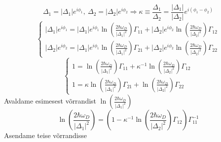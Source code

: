\documentclass[class=article, crop=false]{standalone}
\begin{document}
\begin{equation}\label{key}
	\Delta_{1} = \left| \Delta_{1} \right| e^{i \phi_{1}},\ \Delta_{2} = \left| \Delta_{2} \right| e^{i \phi_{2}} \Rightarrow \kappa \equiv \frac{ \Delta_{1}}{ \Delta_{2}} = \frac{ \left| \Delta_{1} \right|}{\left| \Delta_{2} \right|} e^{i ( \phi_{1} - \phi_{2})}
\end{equation}
\begin{equation}\label{PiluVorrandiSusteemNullTemp}
	\begin{cases}
		\left| \Delta_{1} \right| e^{i \phi_{1}} = \left| \Delta_{1} \right| e^{i \phi_{1}} \ln \left( \frac{2 \hbar \omega_{D}}{ \left| \Delta_{ 1} \right|^{2}} \right) \Gamma_{11} + 
		\left| \Delta_{2} \right| e^{i \phi_{2}} \ln \left( \frac{2 \hbar \omega_{D}}{ \left| \Delta_{ 2} \right|^{2}} \right) \Gamma_{12} \\
		\left| \Delta_{2} \right| e^{i \phi_{2}} = \left| \Delta_{1} \right| e^{i \phi_{1}} \ln \left( \frac{2 \hbar \omega_{D}}{ \left| \Delta_{ 1} \right|^{2}} \right) \Gamma_{21} + \left| \Delta_{2} \right| e^{i \phi_{2}} \ln \left( \frac{2 \hbar \omega_{D}}{ \left| \Delta_{ 2} \right|^{2}} \right) \Gamma_{22}
	\end{cases}
\end{equation}
\begin{equation}\label{key}
	\begin{cases}
		1 = \ln \left( \frac{2 \hbar \omega_{D}}{ \left| \Delta_{ 1} \right|^{2}} \right) \Gamma_{11} + 
		\kappa^{-1} \ln \left( \frac{2 \hbar \omega_{D}}{ \left| \Delta_{ 2} \right|^{2}} \right) \Gamma_{12} \\
		1 = \kappa \ln \left( \frac{2 \hbar \omega_{D}}{ \left| \Delta_{ 1} \right|^{2}} \right) \Gamma_{21} + \ln \left( \frac{2 \hbar \omega_{D}}{ \left| \Delta_{ 2} \right|^{2}} \right) \Gamma_{22}
	\end{cases}
\end{equation}
Avaldame esimesest võrrandist $ \ln \left( \frac{2 \hbar \omega_{D}}{ \left| \Delta_{ 1} \right|^{2}} \right) $
\begin{equation}\label{key}
	\ln \left( \frac{2 \hbar \omega_{D}}{ \left| \Delta_{ 1} \right|^{2}} \right) = \left( 1 - \kappa^{-1} \ln \left( \frac{2 \hbar \omega_{D}}{ \left| \Delta_{2} \right|^{2}} \right) \Gamma_{12} \right) \Gamma_{11}^{-1}
\end{equation}
Asendame teise võrrandisse
\end{document}
